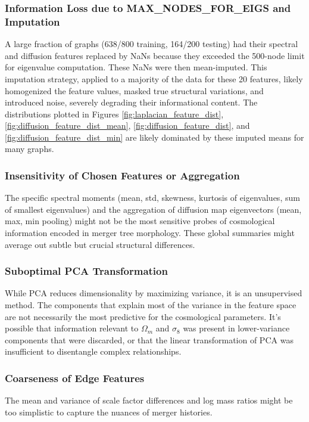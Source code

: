 \documentclass[twocolumn]{aastex631}
\begin{document}
\subsubsection{Information Loss due to MAX\_NODES\_FOR\_EIGS and Imputation}
A large fraction of graphs (638/800 training, 164/200 testing) had their spectral and diffusion features replaced by NaNs because they exceeded the 500-node limit for eigenvalue computation. These NaNs were then mean-imputed. This imputation strategy, applied to a majority of the data for these 20 features, likely homogenized the feature values, masked true structural variations, and introduced noise, severely degrading their informational content. The distributions plotted in Figures \ref{fig:laplacian_feature_dist}, \ref{fig:diffusion_feature_dist_mean}, \ref{fig:diffusion_feature_dist}, and \ref{fig:diffusion_feature_dist_min} are likely dominated by these imputed means for many graphs.

\subsubsection{Insensitivity of Chosen Features or Aggregation}
The specific spectral moments (mean, std, skewness, kurtosis of eigenvalues, sum of smallest eigenvalues) and the aggregation of diffusion map eigenvectors (mean, max, min pooling) might not be the most sensitive probes of cosmological information encoded in merger tree morphology. These global summaries might average out subtle but crucial structural differences.

\subsubsection{Suboptimal PCA Transformation}
While PCA reduces dimensionality by maximizing variance, it is an unsupervised method. The components that explain most of the variance in the feature space are not necessarily the most predictive for the cosmological parameters. It's possible that information relevant to $\Omega_m$ and $\sigma_8$ was present in lower-variance components that were discarded, or that the linear transformation of PCA was insufficient to disentangle complex relationships.

\subsubsection{Coarseness of Edge Features}
The mean and variance of scale factor differences and log mass ratios might be too simplistic to capture the nuances of merger histories.
\end{document}
